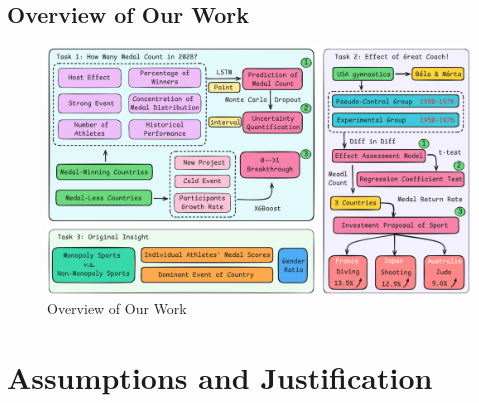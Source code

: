 \documentclass{mcmthesis}
\begin{document}
	\subsection{Overview of Our Work}
		\begin{figure}[H]
		\centering
		\includegraphics[width=1\linewidth]{fig/ourwork.png}
		\caption{Overview of Our Work}
		\label{fig:Overview of Our Work}
	\end{figure}
	
	
	
	
	
	
	
	
\section{Assumptions and Justification}
\end{document}
